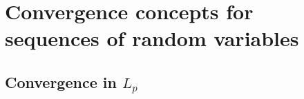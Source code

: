 

\section{Convergence concepts for sequences of random variables}

\subsection{Convergence in $L_p$}

